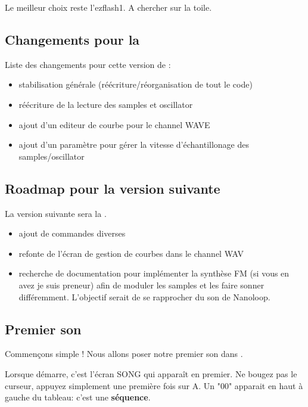 \medskip Le meilleur choix reste l'ezflash1. A chercher sur la toile.

\subsection{Changements pour la \fatversion}

Liste des changements pour cette version de \FAT: \medskip
\begin{itemize}
  \item{stabilisation générale (réécriture/réorganisation de tout le code)}
  \item{réécriture de la lecture des samples et oscillator}
  \item{ajout d'un editeur de courbe pour le channel WAVE}
  \item{ajout d'un paramètre pour gérer la vitesse d'échantillonage des samples/oscillator}
\end{itemize}

\subsection{Roadmap pour la version suivante}

La version suivante sera la \fatnextversion. \medskip
\begin{itemize}
  \item{ajout de commandes diverses}
  \item{refonte de l'écran de gestion de courbes dans le channel WAV}
  \item{recherche de documentation pour implémenter la synthèse FM (si vous en avez je suis preneur) afin de moduler les samples et les faire sonner différemment.
              L'objectif serait de se rapprocher du son de Nanoloop.}
\end{itemize}

\subsection{Premier son}

Commençons simple ! Nous allons poser notre premier son dans \FAT.\medskip

Lorsque \FAT démarre, c'est l'écran SONG qui apparaît en premier.
Ne bougez pas le curseur, appuyez simplement une première fois sur A.
Un "00" apparait en haut à gauche du tableau: c'est une {\bf séquence}.


